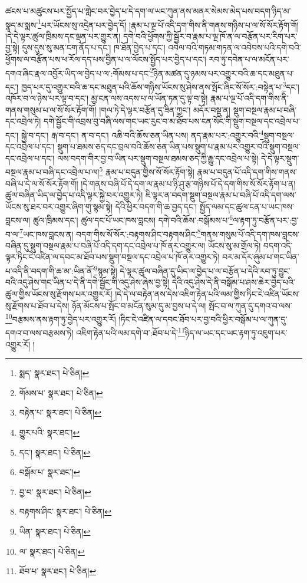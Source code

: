 ཚངས་པ་མཚུངས་པར་སྤྱོད་པ་གླེང་བར་བྱེད་པ་དེ་དག་ལ་ཡང་ཀུན་ནས་མནར་སེམས་མེད་པས་བདག་ཉིད་མ་སྣད་མ་སྨས་\footnote{སྨད་  སྣར་ཐང་།  པེ་ཅིན། }པར་ཡོངས་སུ་འདྲེན་པར་བྱེད་དོ། །རྣམ་པ་ལྔ་པོ་འདི་དག་གིས་ནི་གནས་གཉིས་པ་ལ་སོ་སོར་རྟོག་གོ། །དེ་དེ་ལྟར་ཚུལ་ཁྲིམས་དང་ལྡན་པར་གྱུར་ན། དགེ་བའི་ཕྱོགས་ཀྱི་སྦྱོར་བ་རྣམ་པ་ལྔ་ཁོ་ན་ལ་བརྩོན་པར་རིག་པར་བྱ་སྟེ། དུས་དུས་སུ་མན་ངག་ནོད་པ་དང་། ཁ་ཐོན་བྱེད་པ་དང་། འབེལ་བའི་གཏམ་གཏན་ལ་འབེབས་པའི་དགེ་བའི་ཕྱོགས་ལ་བརྩོན་པས་ཕ་རོལ་དད་པས་བྱིན་པ་ལ་ལོངས་སྤྱོད་པར་བྱེད་པ་དང་། རབ་ཏུ་དབེན་པ་ལ་མངོན་པར་དགའ་ཞིང་རྣལ་འབྱོར་ཡིད་ལ་བྱེད་པ་ལ་:གོམས་པ་དང་\footnote{གོམས་པ་  སྣར་ཐང་།  པེ་ཅིན། }ཉིན་མཚན་དུ་ཉམས་པར་འགྱུར་བའི་ཆ་དང་མཐུན་པ་དང་། ཁྱད་པར་དུ་འགྱུར་བའི་ཆ་དང་མཐུན་པའི་ཆོས་གཉིས་ཡོངས་སུ་ཤེས་ནས་སྤོང་ཞིང་སོ་སོར་:བསྟེན་པ་\footnote{བརྟེན་པ་  སྣར་ཐང་།  པེ་ཅིན། }དང་། འཁོར་བ་ལ་ཉེས་པར་ལྟ་བ་དང་། མྱ་ངན་ལས་འདས་པ་ལ་ཡོན་ཏན་དུ་ལྟ་བ་སྟེ། རྣམ་པ་ལྔ་པོ་འདི་དག་གིས་ནི་གནས་གསུམ་པ་ལ་སོ་སོར་རྟོག་གོ། །གལ་ཏེ་དེ་ལྟར་བརྩོན་དུ་ཟིན་ཀྱང་། མདོར་བསྡུ་ན། སྡུག་བསྔལ་རྣམ་པ་བཞི་དང་འབྲེལ་ཏེ། དགེ་སྦྱོང་གི་འབྲས་བུ་བཞི་ལས་གང་ཡང་རུང་བ་མ་ཐོབ་པས་ངན་སོང་གི་སྡུག་བསྔལ་དང་འབྲེལ་པ་དང་། སྐྱེ་བ་དང་། རྒ་བ་དང་། ན་བ་དང་། འཆི་བའི་ཆོས་ཅན་ཡིན་པས། ནད་རྣམ་པར་:འགྱུར་བའི་\footnote{གྱུར་པའི་  སྣར་ཐང་། }སྡུག་བསྔལ་དང་འབྲེལ་པ་དང་། སྡུག་པ་ཐམས་ཅད་དང་བྲལ་བའི་ཆོས་ཅན་ཡིན་པས་སྡུག་པ་རྣམ་པར་འགྱུར་བའི་སྡུག་བསྔལ་དང་འབྲེལ་པ་དང་། ལས་བདག་གིར་བྱ་བ་ཡིན་པར་སྡུག་བསྔལ་ཐམས་ཅད་ཀྱི་རྒྱུ་དང་འབྲེལ་པ་སྟེ། དེ་དེ་ལྟར་སྡུག་བསྔལ་རྣམ་པ་བཞི་དང་འབྲེལ་པ་ལ།\footnote{དང་།  སྣར་ཐང་།  པེ་ཅིན། } རྣམ་པ་བདུན་གྱིས་སོ་སོར་རྟོག་སྟེ། རྣམ་པ་བདུན་པོ་འདི་དག་གིས་གནས་བཞི་པ་དེ་ལ་སོ་སོར་རྟོག་གོ། །དེ་གནས་བཞི་པོ་དེ་དག་ལ་རྣམ་པ་ཉི་ཤུ་རྩ་གཉིས་པོ་དེ་དག་གིས་སོ་སོར་རྟོག་པ་ན། ཚུལ་བཞིན་ཡིད་ལ་བྱེད་པ་འདི་ལྟར་སྐྱེ་བར་འགྱུར་ཏེ། ཇི་ལྟར་ན་བདག་སྡུག་བསྔལ་རྣམ་པ་བཞི་པོ་འདི་དག་ལས་ཡོངས་སུ་ཐར་བར་འགྱུར་ཞིག་གུ་སྙམ་སྟེ། དེའི་ཕྱིར་བདག་གི་ཆ་བྱད་དང་། སྤྱོད་ལམ་དང་ཚུལ་ངན་པ་ཡང་ཁས་བླངས་ལ། ཚུལ་ཁྲིམས་དང་། ཚུལ་དང་པོ་ཡང་ཁས་བླངས། དགེ་བའི་ཆོས་:བསྒོམས་པ་\footnote{བསྒོམ་པ་  སྣར་ཐང་། }ལ་རྟག་ཏུ་བརྩོན་པར་:བྱ་བ་ལ་\footnote{བྱ་བ་  སྣར་ཐང་།  པེ་ཅིན། }ཡང་ཁས་བླངས་ན། བདག་གིས་སོ་སོར་:བརྟགས་ཤིང་བརྟགས་ཤིང་\footnote{བརྟགས་ཤིང་  སྣར་ཐང་།  པེ་ཅིན། }གནས་གསུམ་པོ་འདི་དག་ཁས་བླངས་བཞིན་དུ་སྡུག་བསྔལ་རྣམ་པ་བཞི་པོ་འདི་དག་དང་འབྲེལ་པ་ཁོ་ནར་འགྱུར་ལ། ཡོངས་སུ་མ་གྲོལ་ཏེ། བདག་འདི་ལྟར་ཏིང་ངེ་འཛིན་ལ་དབང་མ་ཐོབ་པས་སྡུག་བསྔལ་དང་འབྲེལ་པ་ཁོ་ནར་འགྱུར་ཏེ། བར་མ་དོར་ཞུམ་པ་གང་ཡིན་པ་འདི་ནི་བདག་གི་ཆ་མ་:ཡིན་ནོ་\footnote{ཡིན་  སྣར་ཐང་།  པེ་ཅིན། }སྙམ་སྟེ། དེ་ལྟར་ཚུལ་བཞིན་དུ་ཡིད་ལ་བྱེད་པ་ལ་བརྩོན་པ་དེའི་རབ་ཏུ་བྱུང་བའི་འདུ་ཤེས་གང་ཡིན་པ་དེ་ནི་དགེ་སྦྱོང་གི་འདུ་ཤེས་ཞེས་བྱ་སྟེ། དེའི་འདུ་ཤེས་དེ་ནི་བསྒོམ་པ་ཤས་ཆེར་བྱེད་པའི་ཚུལ་གྱིས་ཡོངས་སུ་རྫོགས་པར་འགྱུར་རོ། །དེ་དེ་ལ་བརྟེན་ནས་དེས་འཇིག་རྟེན་པའི་ལམ་གྱིས་ཏིང་ངེ་འཛིན་ཡོངས་སུ་རྫོགས་པ་ཐོབ་པ་དེས། ཉོན་མོངས་པ་སྤོང་བ་མངོན་སུམ་དུ་མ་བྱས་པ་དེ་ལ། སྤོང་བ་ལ་ཀུན་དུ་དགའ་བ་ལས་\footnote{ལ་  སྣར་ཐང་།  པེ་ཅིན། }བརྩམས་ནས་རྟག་ཏུ་བྱེད་པར་འགྱུར་རོ། །ཏིང་ངེ་འཛིན་ལ་དབང་ཐོབ་པར་བྱ་བའི་ཕྱིར་བསྒོམ་པ་ལ་ཀུན་དུ་དགའ་བ་ལས་བརྩམས་ཏེ། འཇིག་རྟེན་པའི་ལམ་དགེ་བ་:ཐོབ་པ་དེ་\footnote{ཐོབ་པ་  སྣར་ཐང་།  པེ་ཅིན། }ཉིད་ལ་ཡང་དང་ཡང་རྟག་ཏུ་འཇུག་པར་འགྱུར་རོ། །
